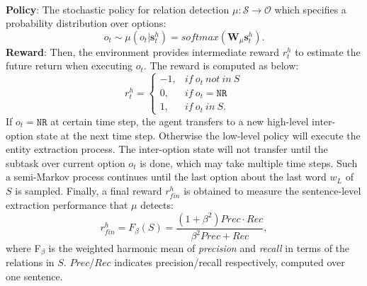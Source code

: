 \documentclass[letterpaper]{article} %
\theoremstyle{definition}
\begin{document}
%
\\
\textbf{Policy}: The stochastic policy for relation detection $\mu: \mathcal{S} \to \mathcal{O}$ which specifies a probability distribution over options:
\begin{equation}\label{option}
    o_t \sim \mu(o_t|\mathbf{s}_t^h) = softmax(\mathbf{W}_\mu \mathbf{s}_t^h).
\end{equation}
%
\textbf{Reward}: Then, the environment provides intermediate reward $r_t^h$ to estimate the future return when executing $o_t$. The reward is computed as below:
\begin{equation}\label{reward_high}
    r_t^h = \left\{
    \begin{array}{ll}
        -1, &if ~ o_t ~ not ~ in ~ S\\
        0, &if ~ o_t = \texttt{NR} \\
        1, &if ~ o_t ~ in ~ S.
    \end{array}
    \right.
\end{equation}
If $o_t = \texttt{NR}$ at certain time step, the agent transfers to a new high-level inter-option state at the next time step. Otherwise the low-level policy will execute the entity extraction process. The inter-option state will not transfer until the subtask over current option $o_t$ is done, which may take multiple time steps. Such a semi-Markov process continues until the last option about the last word $w_L$ of $S$ is sampled. Finally, a final reward $r_{fin}^h$ is obtained to measure the sentence-level extraction performance that $\mu$ detects:
\begin{equation}\label{reward_h_final}
    r_{fin}^h = F_\beta(S) = \frac{(1 + \beta^2) Prec \cdot Rec}{\beta^2 Prec + Rec},
\end{equation}
where F$_\beta$ is the weighted harmonic mean of {\it precision} and {\it recall} in terms of the relations in $S$. $Prec$/$Rec$ indicates precision/recall respectively, computed over one sentence.
\end{document}
